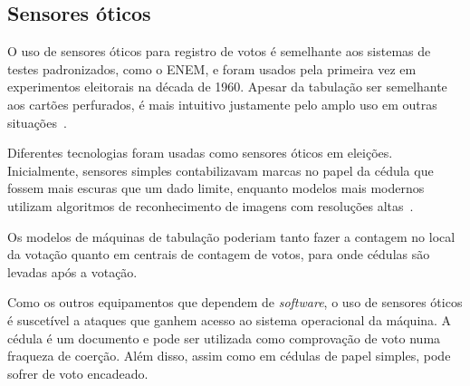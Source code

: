 \subsection{Sensores óticos}

O uso de sensores óticos para registro de votos é semelhante aos sistemas de
testes padronizados, como o ENEM, e foram usados pela primeira vez em
experimentos eleitorais na década de 1960. Apesar da tabulação ser semelhante
aos cartões perfurados, é mais intuitivo justamente pelo amplo uso em outras
situações~\cite{scheffel2002segurancca}.

Diferentes tecnologias foram usadas como sensores óticos em eleições.
Inicialmente, sensores simples contabilizavam marcas no papel da cédula que
fossem mais escuras que um dado limite, enquanto modelos mais modernos utilizam
algoritmos de reconhecimento de imagens com resoluções
altas~\cite{jones2012broken}.

Os modelos de máquinas de tabulação poderiam tanto fazer a contagem no local da
votação quanto em centrais de contagem de votos, para onde cédulas são levadas
após a votação.

Como os outros equipamentos que dependem de \textit{software}, o uso de
sensores óticos é suscetível a ataques que ganhem acesso ao sistema operacional
da máquina. A cédula é um documento e pode ser utilizada como comprovação de
voto numa fraqueza de coerção. Além disso, assim como em cédulas de papel
simples, pode sofrer de voto encadeado.
